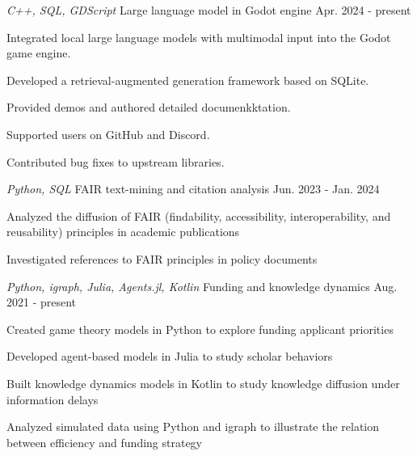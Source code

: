 

\begin{cventries}

  \cventry
    {\emph{C++, SQL, GDScript}} %
    {Large language model in Godot engine} %
    {} %
    {Apr. 2024 - present} %
    {
      \begin{cvitems} %
        \item{Integrated local large language models with multimodal input into the Godot game engine.}
        \item{Developed a retrieval-augmented generation framework based on SQLite.}
        \item{Provided demos and authored detailed documenkktation.}
        \item{Supported users on GitHub and Discord.}
        \item{Contributed bug fixes to upstream libraries.}
      \end{cvitems}
    }

  \cventry
    {\emph{Python, SQL}} %
    {FAIR text-mining and citation analysis} %
    {} %
    {Jun. 2023 - Jan. 2024} %
    {
      \begin{cvitems} %
        \item{Analyzed the diffusion of FAIR (findability, accessibility, interoperability, and reusability) principles in academic publications}
        \item{Investigated references to FAIR principles in policy documents}
      \end{cvitems}
    }


  \cventry
    {\emph{Python, igraph, Julia, Agents.jl, Kotlin}} %
    {Funding and knowledge dynamics} %
    {} %
    {Aug. 2021 - present} %
    {
      \begin{cvitems} %
        \item{Created game theory models in Python to explore funding applicant priorities}
        \item{Developed agent-based models in Julia to study scholar behaviors}
        \item{Built knowledge dynamics models in Kotlin to study knowledge diffusion under information delays}
        \item{Analyzed simulated data using Python and igraph to illustrate the relation between efficiency and funding strategy}
      \end{cvitems}
    }



\end{cventries}
